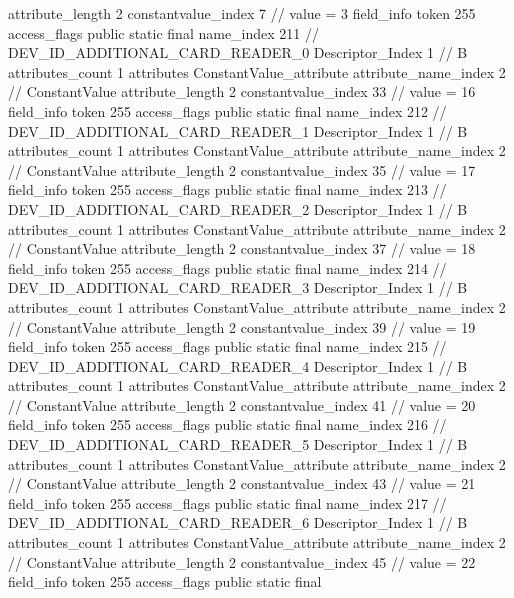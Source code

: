 {{{{{{{					attribute_length	2
					constantvalue_index	7		// value = 3
				}
				}
			}
			field_info {
				token	255
				access_flags	public static final
				name_index	211		// DEV_ID_ADDITIONAL_CARD_READER_0
				Descriptor_Index	1		// B
				attributes_count	1
				attributes {
				ConstantValue_attribute {
					attribute_name_index	2		// ConstantValue
					attribute_length	2
					constantvalue_index	33		// value = 16
				}
				}
			}
			field_info {
				token	255
				access_flags	public static final
				name_index	212		// DEV_ID_ADDITIONAL_CARD_READER_1
				Descriptor_Index	1		// B
				attributes_count	1
				attributes {
				ConstantValue_attribute {
					attribute_name_index	2		// ConstantValue
					attribute_length	2
					constantvalue_index	35		// value = 17
				}
				}
			}
			field_info {
				token	255
				access_flags	public static final
				name_index	213		// DEV_ID_ADDITIONAL_CARD_READER_2
				Descriptor_Index	1		// B
				attributes_count	1
				attributes {
				ConstantValue_attribute {
					attribute_name_index	2		// ConstantValue
					attribute_length	2
					constantvalue_index	37		// value = 18
				}
				}
			}
			field_info {
				token	255
				access_flags	public static final
				name_index	214		// DEV_ID_ADDITIONAL_CARD_READER_3
				Descriptor_Index	1		// B
				attributes_count	1
				attributes {
				ConstantValue_attribute {
					attribute_name_index	2		// ConstantValue
					attribute_length	2
					constantvalue_index	39		// value = 19
				}
				}
			}
			field_info {
				token	255
				access_flags	public static final
				name_index	215		// DEV_ID_ADDITIONAL_CARD_READER_4
				Descriptor_Index	1		// B
				attributes_count	1
				attributes {
				ConstantValue_attribute {
					attribute_name_index	2		// ConstantValue
					attribute_length	2
					constantvalue_index	41		// value = 20
				}
				}
			}
			field_info {
				token	255
				access_flags	public static final
				name_index	216		// DEV_ID_ADDITIONAL_CARD_READER_5
				Descriptor_Index	1		// B
				attributes_count	1
				attributes {
				ConstantValue_attribute {
					attribute_name_index	2		// ConstantValue
					attribute_length	2
					constantvalue_index	43		// value = 21
				}
				}
			}
			field_info {
				token	255
				access_flags	public static final
				name_index	217		// DEV_ID_ADDITIONAL_CARD_READER_6
				Descriptor_Index	1		// B
				attributes_count	1
				attributes {
				ConstantValue_attribute {
					attribute_name_index	2		// ConstantValue
					attribute_length	2
					constantvalue_index	45		// value = 22
				}
				}
			}
			field_info {
				token	255
				access_flags	public static final
}}}}}
